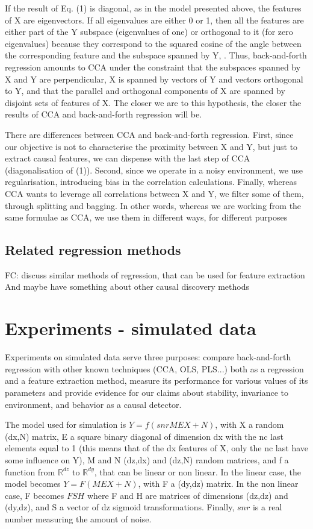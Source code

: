 \documentclass{article}
\begin{document}
If the result of Eq. (1) is diagonal, as in the model presented above, the features of X are eigenvectors.
%
If all eigenvalues are either 0 or 1, then all the features are either part of the Y subspace (eigenvalues of one) or orthogonal to it (for zero eigenvalues) because they correspond to the squared cosine of the angle between the corresponding feature and the subspace spanned by Y, .
%
Thus, back-and-forth regression amounts to CCA under the constraint that the subspaces spanned by X and Y are perpendicular, X is spanned by vectors of Y and vectors orthogonal to Y, and that the parallel and orthogonal components of X are spanned by disjoint sets of features of X.
%
The closer we are to this hypothesis, the closer the results of CCA and back-and-forth regression will be.

There are differences between CCA and back-and-forth regression.
%
First, since our objective is not to characterise the proximity between X and Y, but just to extract causal features, we can dispense with the last step of CCA (diagonalisation of (1)).
%
Second, since we operate in a noisy environment, we use regularisation, introducing bias in the correlation calculations.
%
Finally, whereas CCA wants to leverage all correlations between X and Y, we filter some of them, through splitting and bagging.
%
In other words, whereas we are working from the same formulae as CCA, we use them in different ways, for different purposes

\subsection{Related regression methods}
FC: discuss similar methods of regression, that can be used for feature extraction
And maybe have something about other causal discovery methods

\section{Experiments - simulated data}
Experiments on simulated data serve three purposes: compare back-and-forth regression with other known techniques (CCA, OLS, PLS...) both as a regression and a feature extraction method, measure its performance for various values of its parameters and provide evidence for our claims about stability, invariance to environment, and behavior as a causal detector.

The model used for simulation is $Y=f(snr MEX+N)$, with X a random (dx,N) matrix, E a square binary diagonal of dimension dx with the nc last elements equal to 1 (this means that of the dx features of X, only the nc last have some influence on Y), M and N (dz,dx) and (dz,N) random matrices, and f a function from $\mathbb{R}^{dz}$ to $\mathbb{R}^{dy}$, that can be linear or non linear.
%
In the linear case, the model becomes $Y=F(MEX+N)$, with F a (dy,dz) matrix.
%
In the non linear case, F becomes $FSH$ where F and H are matrices of dimensions (dz,dz) and (dy,dz), and S a vector of dz sigmoid transformations.
%
Finally, $snr$ is a real number measuring the amount of noise.
\end{document}
